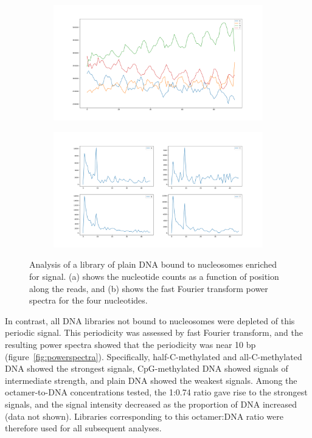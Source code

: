 \documentclass[parskip=full, numbers=noenddot]{scrreprt}
\begin{document}
\begin{figure}[htpb]
  \centering
  \begin{subfigure}[htpb]{\textwidth}
    \centering
    \includegraphics[width=\textwidth]{enriched-counts}
    \caption{}
    \label{fig:enriched_counts}
  \end{subfigure}
  \begin{subfigure}[htpb]{\textwidth}
    \centering
    \includegraphics[width=\textwidth]{enriched-power}
    \caption{}
    \label{fig:enriched_power}
  \end{subfigure}
  \caption{Analysis of a library of plain DNA bound to nucleosomes enriched for signal. (a) shows the nucleotide counts as a function of position along the reads, and (b) shows the fast Fourier transform power spectra for the four nucleotides.}
  \label{fig:enriched}
\end{figure}

In contrast, all DNA libraries not bound to nucleosomes were depleted of this periodic signal.  This periodicity was assessed by fast Fourier transform, and the resulting power spectra showed that the periodicity was near 10 bp (figure~\ref{fig:powerspectra}).  Specifically, half-C-methylated and all-C-methylated DNA showed the strongest signals, %
CpG-methylated DNA showed signals of intermediate strength, and plain DNA showed the weakest signals.  Among the octamer-to-DNA concentrations tested, the 1:0.74 ratio gave rise to the strongest signals, and the signal intensity decreased as the proportion of DNA increased (data not shown).  Libraries corresponding to this octamer:DNA ratio were therefore used for all subsequent analyses.
\end{document}
